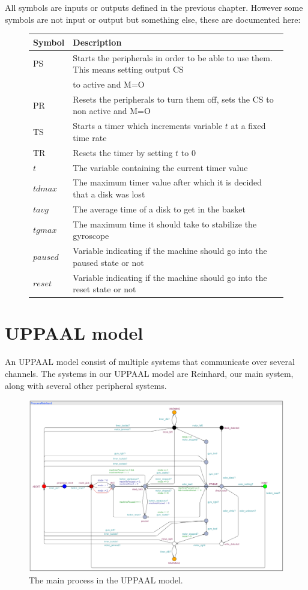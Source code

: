 \documentclass[a4paper,oneside,11pt]{article}
\begin{document}
All symbols are inputs or outputs defined in the previous chapter. However some symbols are not input or output but something else, these are documented here:

\begin{figure}[H]
\begin{tabular}{|l|l|}
\hline
\textbf{Symbol} & \textbf{Description} \\
\hline
PS & Starts the peripherals in order to be able to use them. This means setting output CS \\
 &  to active and M=O \\
PR & Resets the peripherals to turn them off, sets the CS to non active and M=O \\
TS & Starts a timer which increments variable $t$ at a fixed time rate \\
TR & Resets the timer by setting $t$ to 0\\
$t$ & The variable containing the current timer value \\
$tdmax$ & The maximum timer value after which it is decided that a disk was lost \\
$tavg$ & The average time of a disk to get in the basket \\
$tgmax$ & The maximum time it should take to stabilize the gyroscope \\
$paused$ & Variable indicating if the machine should go into the paused state or not \\
$reset$ & Variable indicating if the machine should go into the reset state or not \\
\hline
\end{tabular}
\end{figure}

\section{UPPAAL model}
An UPPAAL model consist of multiple systems that communicate over several channels. The systems in our UPPAAL model are Reinhard, our main system, along with several other peripheral systems.

\begin{figure}[H]
	\centering
	\includegraphics[width=150mm]{mainprocess}
	\caption{The main process in the UPPAAL model.}
\end{figure}
\end{document}
